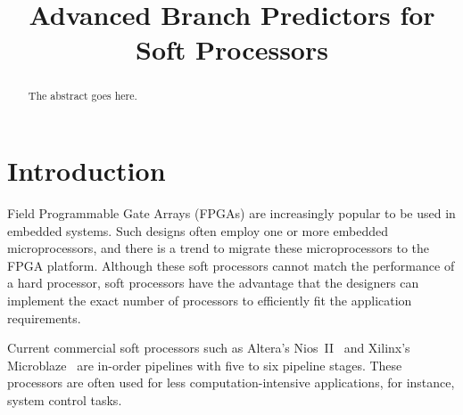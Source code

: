 \documentclass[conference]{IEEEtran}
\begin{document}
\title{Advanced Branch Predictors for Soft Processors}


\author{
}

\maketitle


\begin{abstract}
The abstract goes here.


\end{abstract}


\IEEEpeerreviewmaketitle


\section{Introduction}
\label{sec:intro}
Field Programmable Gate Arrays (FPGAs) are increasingly popular to be used in embedded systems. Such designs often employ one or more embedded microprocessors, and there is a trend to migrate these microprocessors to the FPGA platform. Although these soft processors cannot match the performance of a hard processor, soft processors have the advantage that the designers can implement the exact number of processors to efficiently fit the application requirements.

Current commercial soft processors such as Altera's Nios~II~\cite{niosii} and Xilinx's Microblaze~\cite{microblaze} are in-order pipelines with five to six pipeline stages. These processors are often used for less computation-intensive applications, for instance, system control tasks. 
\end{document}

